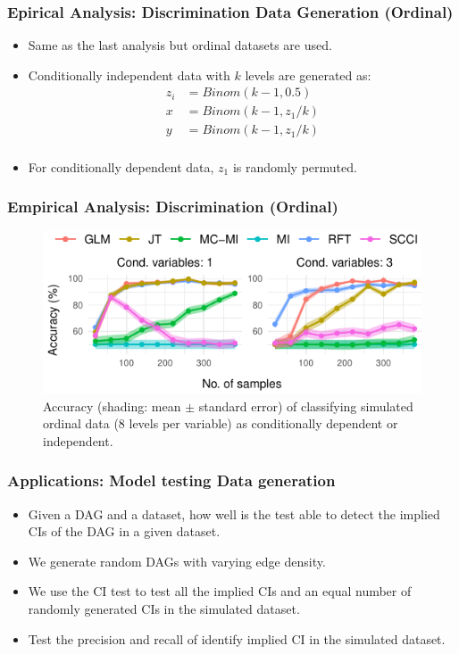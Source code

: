 \documentclass{beamer}
\begin{document}
\begin{frame}
	\frametitle{Epirical Analysis: Discrimination Data Generation (Ordinal)}
	\begin{itemize}
		\item Same as the last analysis but ordinal datasets are used.
		\item Conditionally independent data with $ k $ levels are generated as:
			\begin{equation*}
				\begin{split}
					z_i &= \textit{Binom}(k-1, 0.5) \\
					x &= \textit{Binom}(k-1, z_1/k) \\
					y &= \textit{Binom}(k-1, z_1/k) \\
				\end{split}
			\end{equation*}
		\item For conditionally dependent data, $ z_1 $ is randomly permuted.
	\end{itemize}
\end{frame}

\begin{frame}
	\frametitle{Empirical Analysis: Discrimination (Ordinal)}
	\begin{figure}
		\centering
		\includegraphics{imgs/accuracy_ordinal.pdf}
		\caption*{Accuracy (shading: mean $\pm$ standard error) of
		classifying simulated ordinal data (8 levels per variable) as
		conditionally dependent or independent.}	
	\end{figure}
\end{frame}

\begin{frame}
	\frametitle{Applications: Model testing Data generation}
	\begin{itemize}
		\item Given a DAG and a dataset, how well is the test able to
			detect the implied CIs of the DAG in a given dataset.
		\item We generate random DAGs with varying edge density.
		\item We use the CI test to test all the implied CIs and an equal number of 
			randomly generated CIs in the simulated dataset.
		\item Test the precision and recall of identify implied CI in the simulated dataset.
	\end{itemize}
\end{frame}
\end{document}
